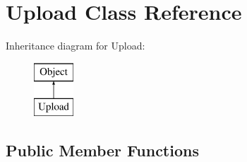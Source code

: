 \hypertarget{class_upload}{\section{Upload Class Reference}
\label{class_upload}
}
Inheritance diagram for Upload\-:\begin{figure}[H]
\begin{center}
\leavevmode
\includegraphics[height=2.000000cm]{class_upload}
\end{center}
\end{figure}
\subsection*{Public Member Functions}
